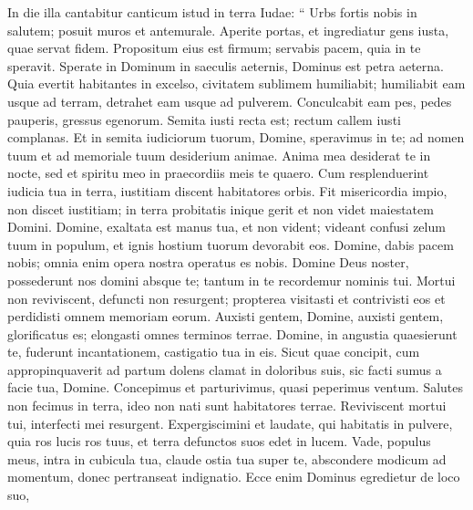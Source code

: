 \begin{biblechapter}
\begin{biblechapter}
\begin{biblechapter}
\begin{biblechapter}
\begin{biblechapter}
\begin{biblechapter}
\begin{biblechapter}
\begin{biblechapter}
\begin{biblechapter}
\begin{biblechapter}
\begin{biblechapter}
\begin{biblechapter}
\begin{biblechapter}
\begin{biblechapter}
\begin{biblechapter}
\begin{biblechapter}
\begin{biblechapter}
\begin{biblechapter}
\begin{biblechapter}
\begin{biblechapter}
\begin{biblechapter}
\begin{biblechapter}
\begin{biblechapter}
\begin{biblechapter}
\begin{biblechapter}
\begin{biblechapter}
\verse In die illa cantabitur canticum istud in terra Iudae:
 “ Urbs fortis nobis in salutem;
 posuit muros et antemurale.
 \verse Aperite portas, et ingrediatur gens iusta,
 quae servat fidem.
 \verse Propositum eius est firmum;
 servabis pacem,
 quia in te speravit.
 \verse Sperate in Dominum in saeculis aeternis,
 Dominus est petra aeterna.
 \verse Quia evertit habitantes in excelso,
 civitatem sublimem humiliabit;
 humiliabit eam usque ad terram,
 detrahet eam usque ad pulverem.
 \verse Conculcabit eam pes, pedes pauperis,
 gressus egenorum.
 \verse Semita iusti recta est;
 rectum callem iusti complanas.
 \verse Et in semita iudiciorum tuorum, Domine, speravimus in te;
 ad nomen tuum et ad memoriale tuum desiderium animae.
 \verse Anima mea desiderat te in nocte,
 sed et spiritu meo in praecordiis meis te quaero.
 Cum resplenduerint iudicia tua in terra,
 iustitiam discent habitatores orbis. 
\verse Fit misericordia impio,
 non discet iustitiam;
 in terra probitatis inique gerit
 et non videt maiestatem Domini.
 \verse Domine, exaltata est manus tua, et non vident;
 videant confusi zelum tuum in populum,
 et ignis hostium tuorum devorabit eos.
 \verse Domine, dabis pacem nobis;
 omnia enim opera nostra operatus es nobis.
 \verse Domine Deus noster, possederunt nos domini absque te;
 tantum in te recordemur nominis tui.
 \verse Mortui non reviviscent,
 defuncti non resurgent;
 propterea visitasti et contrivisti eos et perdidisti omnem memoriam eorum. 
 \verse Auxisti gentem, Domine,
 auxisti gentem, glorificatus es;
 elongasti omnes terminos terrae.
 \verse Domine, in angustia quaesierunt te,
 fuderunt incantationem, castigatio tua in eis.
 \verse Sicut quae concipit, cum appropinquaverit ad partum
 dolens clamat in doloribus suis,
 sic facti sumus a facie tua, Domine.
 \verse Concepimus et parturivimus,
 quasi peperimus ventum.
 Salutes non fecimus in terra,
 ideo non nati sunt habitatores terrae.
 \verse Reviviscent mortui tui, interfecti mei resurgent.
 Expergiscimini et laudate, qui habitatis in pulvere,
 quia ros lucis ros tuus,
 et terra defunctos suos edet in lucem.
 \verse Vade, populus meus, intra in cubicula tua,
 claude ostia tua super te,
 abscondere modicum ad momentum,
 donec pertranseat indignatio.
 \verse Ecce enim Dominus egredietur de loco suo,

\end{biblechapter}
\end{biblechapter}
\end{biblechapter}
\end{biblechapter}
\end{biblechapter}
\end{biblechapter}
\end{biblechapter}
\end{biblechapter}
\end{biblechapter}
\end{biblechapter}
\end{biblechapter}
\end{biblechapter}
\end{biblechapter}
\end{biblechapter}
\end{biblechapter}
\end{biblechapter}
\end{biblechapter}
\end{biblechapter}
\end{biblechapter}
\end{biblechapter}
\end{biblechapter}
\end{biblechapter}
\end{biblechapter}
\end{biblechapter}
\end{biblechapter}
\end{biblechapter}
